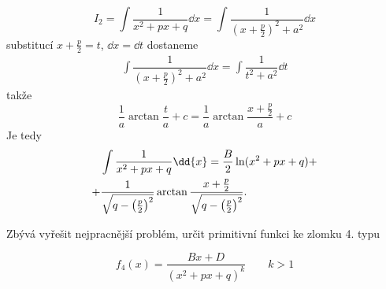       \begin{equation}
        I_2 =\int\dfrac{1}{x^2+px+q}\dd{x} 
            =\int{\dfrac{1}{\left(x+\frac{p}{2}\right)^2 + a^2}}\dd{x}
      \end{equation}
      substitucí \(x + \frac{p}{2} = t\), \(\dd{x} = \dd{t}\) dostaneme 
      \begin{gather*}
        \int{\dfrac{1}{\left(x+\frac{p}{2}\right)^2 + a^2}}\dd{x} = 
        \int{\dfrac{1}{t^2+a^2}}\dd{t}
      \end{gather*}
      takže
      \begin{equation*}
        \dfrac{1}{a}\arctan\dfrac{t}{a} + c = \dfrac{1}{a}\arctan\dfrac{x + \frac{p}{2}}{a} + c 
      \end{equation*}
      Je tedy
      \begin{align}
          &\int\dfrac{1}{x^2+px+q}\dd{x} = \frac{B}{2}\ln(x^2+px+q) +              \notag     \\ 
        + &\frac{1}{\sqrt{q-\left(\frac{p}{2}\right)^2}}
                \arctan\frac{x+\frac{p}{2}}{\sqrt{q-\left(\frac{p}{2}\right)^2}}.  \label{mai:eq171}
      \end{align}
     
      

      Zbývá vyřešit nejpracnější problém, určit primitivní funkci ke zlomku 4. typu
      \begin{mdframed}[style=mdeq] 
        \begin{equation}\label{mai:eq172}
          f_4(x) = \frac{Bx + D}{(x^2+px+q)^k} \qquad k>1
        \end{equation}      
      \end{mdframed}
      
